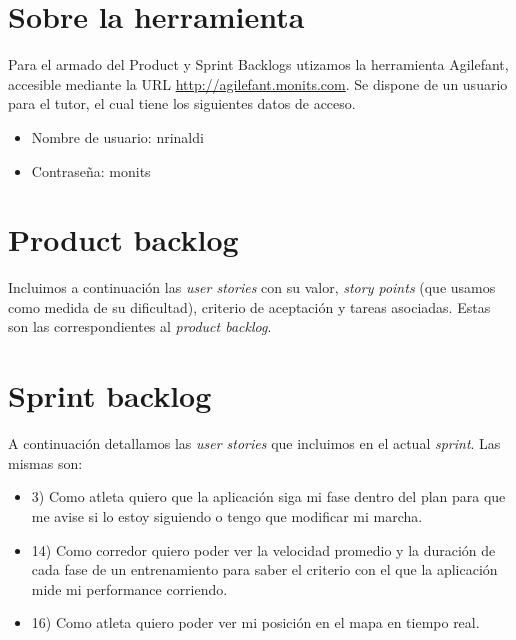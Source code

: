 \documentclass[10pt, a4paper,english,spanish]{article}
\begin{document}

\maketitle
\pagebreak

\tableofcontents
\pagebreak

\section{Sobre la herramienta}

Para el armado del Product y Sprint Backlogs utizamos la herramienta Agilefant,
accesible mediante la URL \url{http://agilefant.monits.com}. Se
dispone de un usuario para el tutor, el cual tiene los siguientes datos de acceso.

\begin{itemize}
	\item Nombre de usuario: nrinaldi
	\item Contrase\~na: monits
\end{itemize}

\section{Product backlog}

Incluimos a continuaci\'on las \textit{user stories} con su valor, \textit{story points} (que usamos
como medida de su dificultad), criterio de aceptaci\'on y tareas asociadas. Estas son las 
correspondientes al \textit{product backlog}.



\section{Sprint backlog}

A continuaci\'on detallamos las \textit{user stories} que incluimos en el actual \textit{sprint}. Las
mismas son:

\begin{itemize}
	\item 3) Como atleta quiero que la aplicación siga mi fase dentro del plan para que me avise si lo estoy siguiendo o tengo que modificar mi marcha.
	\item 14) Como corredor quiero poder ver la velocidad promedio y la duración de cada fase de un entrenamiento para saber el criterio con el que la aplicación mide mi performance corriendo.
	\item 16) Como atleta quiero poder ver mi posición en el mapa en tiempo real. 
\end{itemize}
\end{document}
